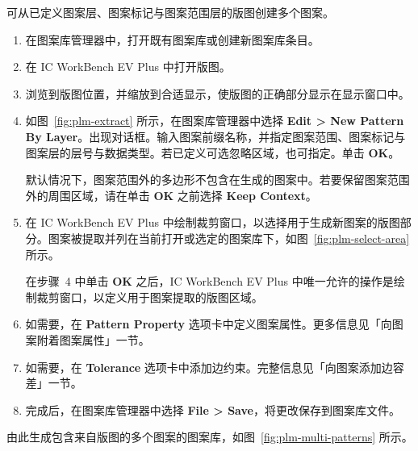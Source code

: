 可从已定义图案层、图案标记与图案范围层的版图创建多个图案。

\begin{enumerate}
  \item 在图案库管理器中，打开既有图案库或创建新图案库条目。
  \item 在 IC WorkBench EV Plus 中打开版图。
  \item 浏览到版图位置，并缩放到合适显示，使版图的正确部分显示在显示窗口中。
  \item 如图~\ref{fig:plm-extract} 所示，在图案库管理器中选择 \textbf{Edit > New Pattern By Layer}。出现对话框。输入图案前缀名称，并指定图案范围、图案标记与图案层的层号与数据类型。若已定义可选忽略区域，也可指定。单击 \textbf{OK}。


\begin{noteBox}
默认情况下，图案范围外的多边形不包含在生成的图案中。若要保留图案范围外的周围区域，请在单击 \textbf{OK} 之前选择 \textbf{Keep Context}。
\end{noteBox}

  \item 在 IC WorkBench EV Plus 中绘制裁剪窗口，以选择用于生成新图案的版图部分。图案被提取并列在当前打开或选定的图案库下，如图~\ref{fig:plm-select-area} 所示。


\begin{noteBox}
在步骤~4 中单击 \textbf{OK} 之后，IC WorkBench EV Plus 中唯一允许的操作是绘制裁剪窗口，以定义用于图案提取的版图区域。
\end{noteBox}

  \item 如需要，在 \textbf{Pattern Property} 选项卡中定义图案属性。更多信息见「向图案附着图案属性」一节。
  \item 如需要，在 \textbf{Tolerance} 选项卡中添加边约束。完整信息见「向图案添加边容差」一节。
  \item 完成后，在图案库管理器中选择 \textbf{File > Save}，将更改保存到图案库文件。
\end{enumerate}

由此生成包含来自版图的多个图案的图案库，如图~\ref{fig:plm-multi-patterns} 所示。


